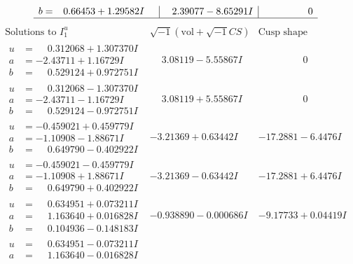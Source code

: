 \documentclass[1p]{elsarticle_modified}
\theoremstyle{definition}
\newcommand{\I}{\sqrt{-1}}
\begin{document}
$$\begin{array}{c|c|c}
\begin{aligned}
b &= \phantom{-}0.66453 + 1.29582 I\end{aligned}
 & \phantom{-}2.39077 - 8.65291 I & \phantom{-0.000000 } 0\\
 \hline 
 \end{array}$$\newpage$$\begin{array}{c|c|c}  
\text{Solutions to }I^u_{1}& \I (\text{vol} + \sqrt{-1}CS) & \text{Cusp shape}\\
 \hline 
\begin{aligned}
u &= \phantom{-}0.312068 + 1.307370 I \\
a &= -2.43711 + 1.16729 I \\
b &= \phantom{-}0.529124 + 0.972751 I\end{aligned}
 & \phantom{-}3.08119 - 5.55867 I & \phantom{-0.000000 } 0 \\ \hline\begin{aligned}
u &= \phantom{-}0.312068 - 1.307370 I \\
a &= -2.43711 - 1.16729 I \\
b &= \phantom{-}0.529124 - 0.972751 I\end{aligned}
 & \phantom{-}3.08119 + 5.55867 I & \phantom{-0.000000 } 0 \\ \hline\begin{aligned}
u &= -0.459021 + 0.459779 I \\
a &= -1.10908 - 1.88671 I \\
b &= \phantom{-}0.649790 - 0.402922 I\end{aligned}
 & -3.21369 + 0.63442 I & -17.2881 - 6.4476 I \\ \hline\begin{aligned}
u &= -0.459021 - 0.459779 I \\
a &= -1.10908 + 1.88671 I \\
b &= \phantom{-}0.649790 + 0.402922 I\end{aligned}
 & -3.21369 - 0.63442 I & -17.2881 + 6.4476 I \\ \hline\begin{aligned}
u &= \phantom{-}0.634951 + 0.073211 I \\
a &= \phantom{-}1.163640 + 0.016828 I \\
b &= \phantom{-}0.104936 - 0.148183 I\end{aligned}
 & -0.938890 - 0.000686 I & -9.17733 + 0.04419 I \\ \hline\begin{aligned}
u &= \phantom{-}0.634951 - 0.073211 I \\
a &= \phantom{-}1.163640 - 0.016828 I \\

\end{aligned}
\end{array}$$
\end{document}

